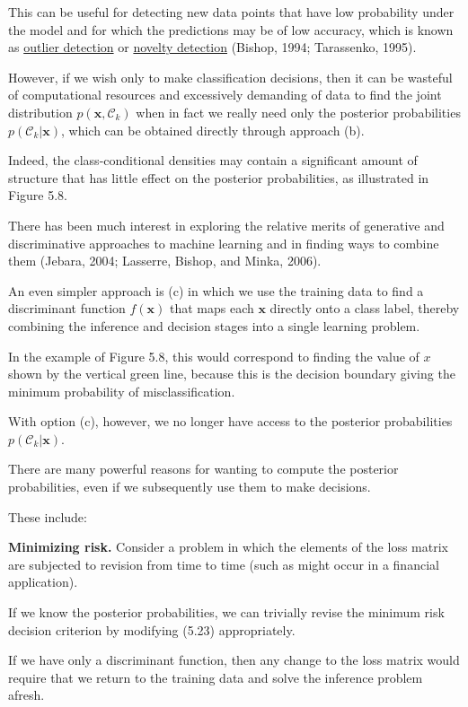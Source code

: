 \documentclass{article}
\begin{document}
This can be useful for detecting new data points that have low probability under the model and for which the predictions may be of low accuracy, which is known as \underline{\color{red}outlier detection} or \underline{\color{red}novelty detection} (Bishop, 1994; Tarassenko, 1995).

However, if we wish only to make classification decisions, then it can be wasteful of computational resources and excessively demanding of data to find the joint distribution $p(\mathbf{x},\mathcal{C}_{k})$ when in fact we really need only the posterior probabilities $p(\mathcal{C}_{k}|\mathbf{x})$, which can be obtained directly through approach (b). 

Indeed, the class-conditional densities may contain a significant amount of structure that has little effect on the posterior probabilities, as illustrated in Figure 5.8. 

There has been much interest in exploring the relative merits of generative and discriminative approaches to machine learning and in finding ways to combine them (Jebara, 2004; Lasserre, Bishop, and Minka, 2006).

An even simpler approach is (c) in which we use the training data to find a discriminant function $f(\mathbf{x})$ that maps each $\mathbf{x}$ directly onto a class label, thereby combining the inference and decision stages into a single learning problem. 

In the example of Figure 5.8, this would correspond to finding the value of $x$ shown by the vertical green line, because this is the decision boundary giving the minimum probability of misclassification.

With option (c), however, we no longer have access to the posterior probabilities $p(\mathcal{C}_{k}|\mathbf{x})$. 

There are many powerful reasons for wanting to compute the posterior probabilities, even if we subsequently use them to make decisions. 

These include:

\textbf{Minimizing risk.} Consider a problem in which the elements of the loss matrix are subjected to revision from time to time (such as might occur in a financial application). 

If we know the posterior probabilities, we can trivially revise the minimum risk decision criterion by modifying (5.23) appropriately. 

If we have only a discriminant function, then any change to the loss matrix would require that we return to the training data and solve the inference problem afresh.
\end{document}
